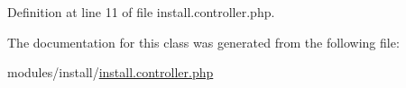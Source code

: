 Definition at line 11 of file install.\+controller.\+php.



The documentation for this class was generated from the following file\+:\begin{DoxyCompactItemize}
\item 
modules/install/\hyperlink{install_8controller_8php}{install.\+controller.\+php}\end{DoxyCompactItemize}

